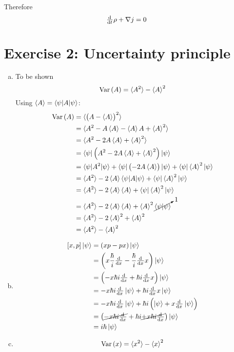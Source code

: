 \documentclass[a4paper,german,12pt,smallheadings]{scrartcl}
\DeclareMathOperator{\Var}{Var}
\begin{document}
Therefore
\begin{equation*}
  \od{}{t} \rho + \nabla j = 0
\end{equation*}

\section*{Exercise 2: Uncertainty principle}
\begin{enumerate}[a)]
  \item
    To be shown
    \begin{equation*}
      \Var\del{A} = \braket{A^2} - \braket{A}^2
    \end{equation*}
    Using $\braket{A} = \braket{\psi|A|\psi}$:
    \begin{align*}
      \Var\del{A} &= \braket{\del{A - \braket{A}}^2} \\
                  &= \braket{A^2 - A\braket{A} - \braket{A}A + \braket{A}^2} \\
                  &= \braket{A^2 - 2A\braket{A} + \braket{A}^2} \\
                  &= \braket{\psi|\del{A^2 - 2A\braket{A} + \braket{A}^2}|\psi} \\
                  &= \braket{\psi|A^2|\psi} + \braket{\psi|\del{-2A\braket{A}}|\psi}+ \braket{\psi|\braket{A}^2|\psi} \\
                  &= \braket{A^2} - 2\braket{A}\braket{\psi|A|\psi} + \braket{\psi|\braket{A}^2|\psi} \\
                  &= \braket{A^2} - 2\braket{A}\braket{A} + \braket{\psi|\braket{A}^2|\psi} \\
                  &= \braket{A^2} - 2\braket{A}\braket{A} + \braket{A}^2 \cancelto{1}{\braket{\psi|\psi}} \\
                  &= \braket{A^2} - 2\braket{A}^2 + \braket{A}^2 \\
                  &= \braket{A^2} - \braket{A}^2
    \end{align*}
  \item
    \begin{align*}
      \sbr{x,p} \ket{\psi} &= \del{xp - px}\ket{\psi} \\
                          &= \del{x \frac{\hbar}{i} \od{}{x} - \frac{\hbar}{i} \od{}{x} x} \ket{\psi} \\
                          &= \del{-x \hbar i \od{}{x} + \hbar i \od{}{x} x} \ket{\psi} \\
                          &= -x \hbar i \od{}{x} \ket{\psi} + \hbar i \od{}{x} x \ket{\psi} \\
                          &= -x \hbar i \od{}{x} \ket{\psi} + \hbar i \del{\ket{\psi} + x \od{}{x}\ket{\psi}} \\
                          &= \del{\cancel{-x \hbar i \od{}{x}} + \hbar i \cancel{+ x \hbar i \od{}{x}}} \ket{\psi} \\
                          &= i \hbar \ket{\psi}
    \end{align*}
  \item
    \begin{align*}
      \Var\del{x} = \braket{x^2} - \braket{x}^2
    \end{align*}


\end{enumerate}
\end{document}
